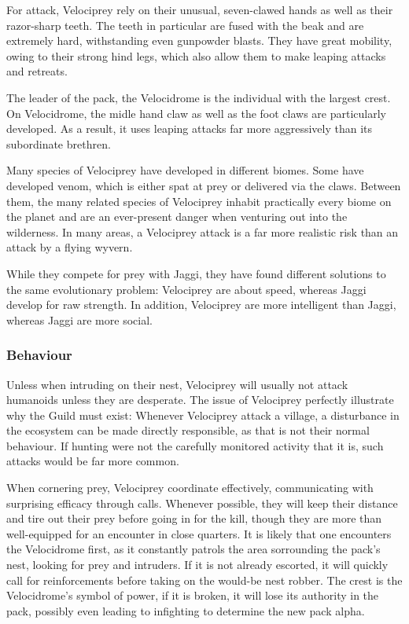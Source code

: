 For attack, Velociprey rely on their unusual, seven-clawed hands as well as their razor-sharp teeth. The teeth in particular are fused with the beak and are extremely hard, withstanding even gunpowder blasts. They have great mobility, owing to their strong hind legs, which also allow them to make leaping attacks and retreats.

The leader of the pack, the Velocidrome is the individual with the largest crest. On Velocidrome, the midle hand claw as well as the foot claws are particularly developed. As a result, it uses leaping attacks far more aggressively than its subordinate brethren.

Many species of Velociprey have developed in different biomes. Some have developed venom, which is either spat at prey or delivered via the claws. Between them, the many related species of Velociprey inhabit practically every biome on the planet and are an ever-present danger when venturing out into the wilderness. In many areas, a Velociprey attack is a far more realistic risk than an attack by a flying wyvern.

While they compete for prey with Jaggi, they have found different solutions to the same evolutionary problem: Velociprey are about speed, whereas Jaggi develop for raw strength. In addition, Velociprey are more intelligent than Jaggi, whereas Jaggi are more social.

\subsubsection{Behaviour}
Unless when intruding on their nest, Velociprey will usually not attack humanoids unless they are desperate. The issue of Velociprey perfectly illustrate why the Guild must exist: Whenever Velociprey attack a village, a disturbance in the ecosystem can be made directly responsible, as that is not their normal behaviour. If hunting were not the carefully monitored activity that it is, such attacks would be far more common.

When cornering prey, Velociprey coordinate effectively, communicating with surprising efficacy through calls. Whenever possible, they will keep their distance and tire out their prey before going in for the kill, though they are more than well-equipped for an encounter in close quarters. It is likely that one encounters the Velocidrome first, as it constantly patrols the area sorrounding the pack's nest, looking for prey and intruders. If it is not already escorted, it will quickly call for reinforcements before taking on the would-be nest robber. The crest is the Velocidrome's symbol of power, if it is broken, it will lose its authority in the pack, possibly even leading to infighting to determine the new pack alpha.

